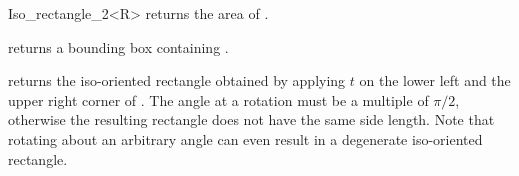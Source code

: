 \begin{ccRefClass} {Iso_rectangle_2<R>}
       {returns the area of \ccVar. }

       {returns a bounding box containing \ccVar. }

       {returns the iso-oriented rectangle obtained by applying $t$ on 
        the lower left and the upper right corner of \ccVar.
        \ccPrecond The angle at a rotation must be a multiple of $\pi/2$,
        otherwise the resulting rectangle does not have the same side length.
        Note that rotating about an arbitrary angle can even result in
        a degenerate  iso-oriented rectangle.}





\end{ccRefClass} 
